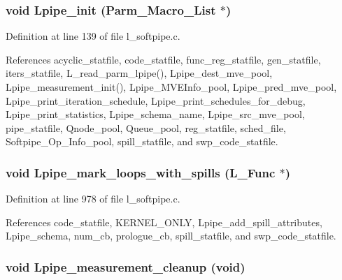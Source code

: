 \subsubsection{\setlength{\rightskip}{0pt plus 5cm}void Lpipe\_\-init (Parm\_\-Macro\_\-List $\ast$)}\label{l__softpipe_8h_0044ecaec153a71b1a018fcb06d92665}




Definition at line 139 of file l\_\-softpipe.c.

References acyclic\_\-statfile, code\_\-statfile, func\_\-reg\_\-statfile, gen\_\-statfile, iters\_\-statfile, L\_\-read\_\-parm\_\-lpipe(), Lpipe\_\-dest\_\-mve\_\-pool, Lpipe\_\-measurement\_\-init(), Lpipe\_\-MVEInfo\_\-pool, Lpipe\_\-pred\_\-mve\_\-pool, Lpipe\_\-print\_\-iteration\_\-schedule, Lpipe\_\-print\_\-schedules\_\-for\_\-debug, Lpipe\_\-print\_\-statistics, Lpipe\_\-schema\_\-name, Lpipe\_\-src\_\-mve\_\-pool, pipe\_\-statfile, Qnode\_\-pool, Queue\_\-pool, reg\_\-statfile, sched\_\-file, Softpipe\_\-Op\_\-Info\_\-pool, spill\_\-statfile, and swp\_\-code\_\-statfile.
\subsubsection{\setlength{\rightskip}{0pt plus 5cm}void Lpipe\_\-mark\_\-loops\_\-with\_\-spills (L\_\-Func $\ast$)}\label{l__softpipe_8h_069ce3dfcfa7ef2d0e36b64aa8348cb3}




Definition at line 978 of file l\_\-softpipe.c.

References code\_\-statfile, KERNEL\_\-ONLY, Lpipe\_\-add\_\-spill\_\-attributes, Lpipe\_\-schema, num\_\-cb, prologue\_\-cb, spill\_\-statfile, and swp\_\-code\_\-statfile.
\subsubsection{\setlength{\rightskip}{0pt plus 5cm}void Lpipe\_\-measurement\_\-cleanup (void)}\label{l__softpipe_8h_c18c12740729ece750284668380d64dd}




